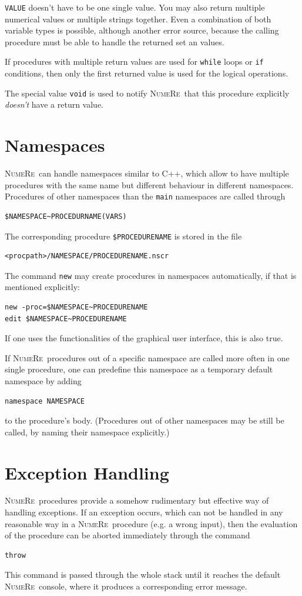 \documentclass[DIV=14,headsepline,footsepline]{scrbook}
\newcommand{\NR}{\textsc{Nu\-me\-Re}}
\begin{document}
				\lstinline+VALUE+ doesn't have to be one single value. You may also return multiple numerical values or multiple strings together. Even a combination of both variable types is possible, although another error source, because the calling procedure must be able to handle the returned set an values.
				
				If procedures with multiple return values are used for \lstinline+while+ loops or \lstinline+if+ conditions, then only the first returned value is used for the logical operations.
				
				The special value \lstinline+void+ is used to notify \NR\ that this procedure explicitly \emph{doesn't} have a return value.
			\section{Namespaces}
				\NR\ can handle namespaces similar to C++, which allow to have multiple procedures with the same name but different behaviour in different namespaces. Procedures of other namespaces than the \lstinline+main+ namespaces are called through 
				\begin{lstlisting}
$NAMESPACE~PROCEDURNAME(VARS)
				\end{lstlisting}
				The corresponding procedure \lstinline+$PROCEDURENAME+ is stored in the file 
				\begin{lstlisting}
<procpath>/NAMESPACE/PROCEDURENAME.nscr
				\end{lstlisting}
				The command \lstinline+new+ may create procedures in namespaces automatically, if that is mentioned explicitly:
				\begin{lstlisting}
new -proc=$NAMESPACE~PROCEDURENAME
edit $NAMESPACE~PROCEDURENAME
				\end{lstlisting}
				If one uses the functionalities of the graphical user interface, this is also true.
				
				If \NR\ procedures out of a specific namespace are called more often in one single procedure, one can predefine this namespace as a temporary default namespace by adding
				\begin{lstlisting}
namespace NAMESPACE
				\end{lstlisting}
				to the procedure's body. (Procedures out of other namespaces may be still be called, by naming their namespace explicitly.)
			\section{Exception Handling}
				\NR\ procedures provide a somehow rudimentary but effective way of handling exceptions. If an exception occurs, which can not be handled in any reasonable way in a \NR\ procedure (e.g. a wrong input), then the evaluation of the procedure can be aborted immediately through the command
				\begin{lstlisting}
throw
				\end{lstlisting}
				This command is passed through the whole stack until it reaches the default \NR\ console, where it produces a corresponding error message.
				
\end{document}

